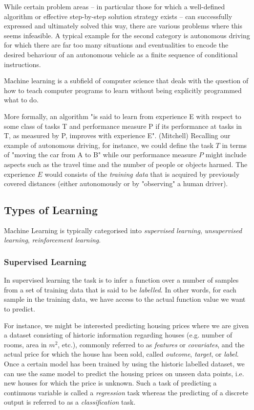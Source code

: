While certain problem areas -- in particular those for which a well-defined algorithm or effective step-by-step solution strategy exists -- can successfully expressed and ultimately solved this way, there are various problems where this seems infeasible. A typical example for the second category is autonomous driving for which there are far too many situations and eventualities to encode the desired behaviour of an autonomous vehicle as a finite sequence of conditional instructions. 

Machine learning is a subfield of computer science that deals with the question of how to teach computer programs to learn without being explicitly programmed what to do. 

More formally, an algorithm "is said to learn from experience E with respect to some class of tasks T and performance measure P if its performance at tasks in T, as measured by P, improves with experience E". (Mitchell)
Recalling our example of autonomous driving, for instance, we could define the task $T$ in terms of "moving the car from A to B" while our performance measure $P$ might include aspects such as the travel time and the number of people or objects harmed. The experience $E$ would consists of the \emph{training data} that is acquired by previously covered distances (either autonomously or by "observing" a human driver). 


\subsection{Types of Learning}
Machine Learning is typically categorised into \emph{supervised learning}, \emph{unsupervised learning}, \emph{reinforcement learning}. 

\subsubsection{Supervised Learning} 
In supervised learning the task is to infer a function over a number of samples from a set of training data that is said to be \emph{labelled}. In other words, for each sample in the training data, we have access to the actual function value we want to predict. 

For instance, we might be interested predicting housing prices where we are given a dataset consisting of historic information regarding houses (e.g. number of rooms, area in $m^2$, etc.), commonly referred  to as \emph{features} or \emph{covariates}, and the actual price for which the house has been sold, called \emph{outcome}, \emph{target}, or \emph{label}. Once a certain model has been trained by using the historic labelled dataset, we can use the same model to predict the housing prices on unseen data points, i.e. new houses for which the price is unknown. Such a task of predicting a continuous variable is called a \emph{regression} task whereas the predicting of a discrete output is referred to as a \emph{classification} task. 

